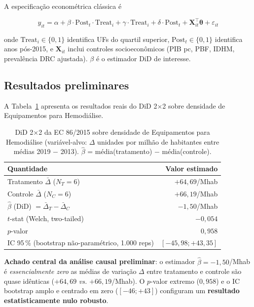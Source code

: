 \documentclass[12pt,a4paper,oneside]{article}
\begin{document}
\noindent
A especificação econométrica clássica é

\begin{equation}
y_{it} = \alpha + \beta \cdot \text{Post}_t \cdot \text{Treat}_i
+ \gamma \cdot \text{Treat}_i + \delta \cdot \text{Post}_t
+ \mathbf{X}_{it}^\top \boldsymbol{\theta} + \varepsilon_{it}
\label{eq:did}
\end{equation}

\noindent
onde $\text{Treat}_i \in \{0, 1\}$ identifica UFs do quartil
superior, $\text{Post}_t \in \{0, 1\}$ identifica anos
pós-2015, e $\mathbf{X}_{it}$ inclui controles socioeconômicos
(PIB pc, PBF, IDHM, prevalência DRC ajustada). $\beta$ é o
estimador DiD de interesse.

\subsection{Resultados preliminares}

A Tabela~\ref{tab:did-results} apresenta os resultados reais do
DiD 2$\times$2 sobre densidade de Equipamentos para Hemodiálise.

\begin{table}[htbp]
\centering
\caption{DiD 2$\times$2 da EC 86/2015 sobre densidade de
Equipamentos para Hemodiálise (variável-alvo: $\Delta$ unidades
por milhão de habitantes entre médias 2019
$-$ 2013). $\hat\beta$ = média(tratamento) $-$
média(controle).}
\label{tab:did-results}
\small
\begin{tabular}{l r}
\toprule
\textbf{Quantidade} & \textbf{Valor estimado} \\
\midrule
Tratamento $\bar{\Delta}$ ($N_T=6$)                & $+64{,}69$/Mhab \\
Controle  $\bar{\Delta}$ ($N_C=6$)                 & $+66{,}19$/Mhab \\
\midrule
$\hat\beta$ (DiD) $= \bar{\Delta}_T - \bar{\Delta}_C$ & $-1{,}50$/Mhab \\
$t$-stat (Welch, two-tailed)                       & $-0{,}054$ \\
$p$-valor                                          & $0{,}958$ \\
IC 95\,\% (bootstrap não-paramétrico, 1.000 reps)  & $[-45{,}98; +43{,}35]$ \\
\bottomrule
\end{tabular}
\end{table}

\textbf{Achado central da análise causal preliminar}: o
estimador $\hat\beta = -1{,}50$/Mhab é \textit{essencialmente
zero} \textemdash{} as médias de variação $\Delta$ entre
tratamento e controle são quase idênticas ($+64{,}69$ \textit{vs.}
$+66{,}19$/Mhab). O $p$-valor extremo ($0{,}958$) e o IC
bootstrap amplo e centrado em zero ($[-46; +43]$) configuram um
\textbf{resultado estatisticamente nulo robusto}.
\end{document}
